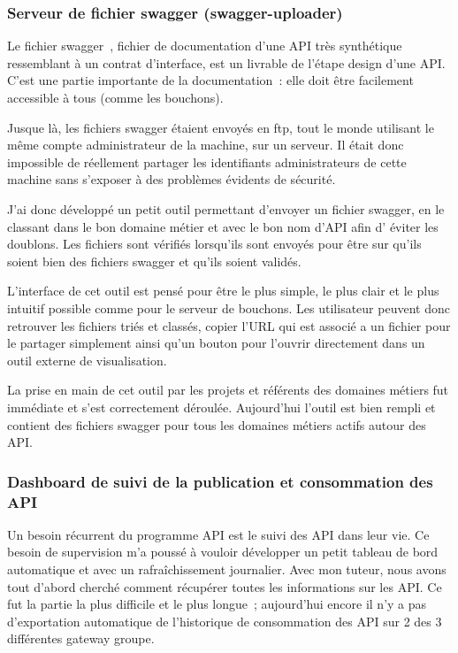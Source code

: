         \subsubsection{Serveur de fichier swagger (swagger-uploader)}

        Le fichier swagger\, , fichier de documentation d’une API très synthétique ressemblant à un contrat d’interface, est un livrable de l’étape design d’une API.
        C’est une partie importante de la documentation : elle doit être facilement accessible à tous (comme les bouchons).

        Jusque là, les fichiers swagger étaient envoyés en ftp, tout le monde utilisant le même compte administrateur de la machine, sur un serveur.
        Il était donc impossible de réellement partager les identifiants administrateurs de cette machine sans s’exposer à des problèmes évidents de sécurité.

        J’ai donc développé un petit outil permettant d’envoyer un  fichier swagger, en le classant dans le bon domaine métier et avec le bon nom d’API afin d’ éviter les doublons.
        Les fichiers sont vérifiés lorsqu’ils sont envoyés pour être sur qu’ils soient bien des fichiers swagger et qu’ils soient  validés.

        L’interface de cet outil est pensé pour être le plus simple, le plus clair et le plus intuitif possible comme pour le serveur de bouchons.
        Les utilisateur peuvent donc retrouver les fichiers triés et classés, copier l’URL qui est associé a un fichier pour le partager simplement ainsi qu’un bouton pour l’ouvrir directement dans un outil externe de visualisation.

        La prise en main de cet outil par les projets et référents des domaines métiers fut immédiate et s’est correctement déroulée.
        Aujourd’hui l’outil est bien rempli et contient des fichiers swagger pour tous les domaines métiers actifs autour des API.

        \subsubsection{Dashboard de suivi de la publication et consommation des API}

        Un besoin récurrent du programme API est le suivi des API dans leur vie.
        Ce besoin de supervision m’a poussé à vouloir développer un petit tableau de bord automatique et avec un rafraîchissement journalier.
        Avec mon tuteur, nous avons tout d’abord cherché comment récupérer toutes les informations sur les API.
        Ce fut la partie la plus difficile et le plus longue ; aujourd’hui encore il n’y a  pas d’exportation automatique de l’historique de consommation des API sur 2 des 3 différentes gateway groupe.


